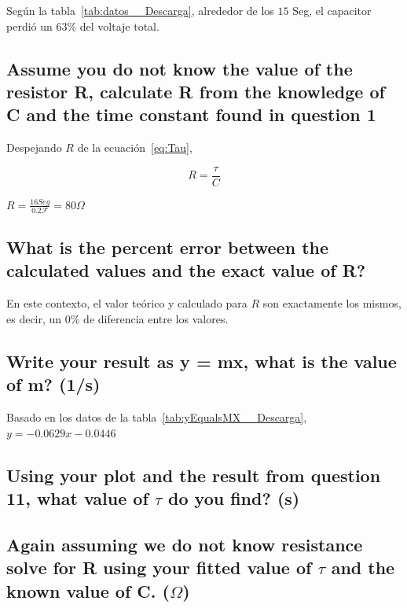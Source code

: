 \documentclass[twocolumn, 12pt]{article}
\begin{document}
Según la tabla~\ref{tab:datos__Descarga}, alrededor de los
$15$ Seg, el capacitor perdió un $63\%$ del voltaje total.

\subsection{Assume you do not know the value of the resistor R, calculate R from the knowledge of
    C and the time constant found in question 1}

Despejando $R$ de la ecuación~\eqref{eq:Tau},

{\large
        \begin{equation}
            R = \frac{\tau}{C}
        \end{equation}
    }

$R = \frac{16 Seg}{0.2\mathcal{F}} = 80 \Omega$

\subsection{What is the percent error between the calculated values and the exact value of R?}

En este contexto, el valor teórico y calculado para $R$ son
exactamente los mismos, es decir, un 0\% de diferencia
entre los valores.

\subsection{Write your result as y = mx, what is the value of m? (1/s)}

Basado en los datos de la
tabla~\ref{tab:yEqualsMX__Descarga}, $y= -0.0629x -0.0446$

\subsection{Using your plot and the result from question 11, what value of $\tau$ do you find? (s)}



\subsection{Again assuming we do not know resistance solve for R using your fitted value of $\tau$ and
    the known value of C. ($\Omega$)}
\end{document}
